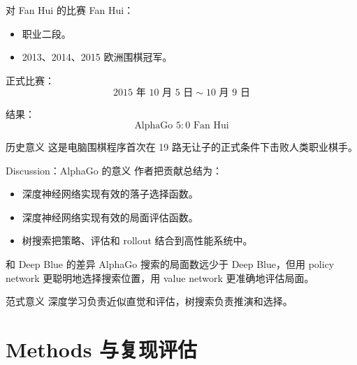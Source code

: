 \documentclass[UTF8,aspectratio=169,10pt]{ctexbeamer}
\begin{document}
\begin{frame}{对 Fan Hui 的比赛}
  Fan Hui：
  \begin{itemize}
    \item 职业二段。
    \item 2013、2014、2015 欧洲围棋冠军。
  \end{itemize}

  正式比赛：
  \[
    2015\text{ 年 }10\text{ 月 }5\text{ 日} \sim 10\text{ 月 }9\text{ 日}
  \]

  结果：
  \[
    \text{AlphaGo } 5:0 \text{ Fan Hui}
  \]

  \begin{alertblock}{历史意义}
    这是电脑围棋程序首次在 19 路无让子的正式条件下击败人类职业棋手。
  \end{alertblock}
\end{frame}

\begin{frame}{Discussion：AlphaGo 的意义}
  作者把贡献总结为：

  \begin{itemize}
    \item 深度神经网络实现有效的落子选择函数。
    \item 深度神经网络实现有效的局面评估函数。
    \item 树搜索把策略、评估和 rollout 结合到高性能系统中。
  \end{itemize}

  \begin{block}{和 Deep Blue 的差异}
    AlphaGo 搜索的局面数远少于 Deep Blue，但用 policy network 更聪明地选择搜索位置，用 value network 更准确地评估局面。
  \end{block}

  \begin{block}{范式意义}
    深度学习负责近似直觉和评估，树搜索负责推演和选择。
  \end{block}
\end{frame}

\section{Methods 与复现评估}
\end{document}
